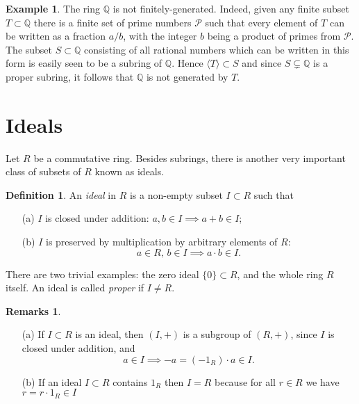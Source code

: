 \documentclass [12pt,oneside,a4paper,mathscr]{amsart}
\theoremstyle{definition}
\newtheorem{defn}[thm]{Definition}
\newtheorem{remarks}[thm]{Remarks}
\newtheorem{example}[thm]{Example}
\renewcommand{\P}{\mathcal{P}}
\newcommand{\Q}{\mathbb{Q}}
\begin{document}
\begin{example}
The ring $\Q$ is not finitely-generated. Indeed, given any finite subset $T\subset \Q$ there is a finite set of prime numbers $\P$ such that every element of $T$ can be written as a fraction $a/b$, with the integer $b$ being a product of primes from $\P$. The subset $S\subset \Q$ consisting of all rational numbers which can be written in this form  is easily seen to be a  subring of $\Q$. Hence $\langle T \rangle \subset S$ and since $S\subsetneq \Q$ is a proper subring, it follows that $\Q$ is not generated by $T$.
\end{example}






\section{Ideals}

Let $R$ be a commutative ring. Besides subrings, there is another very important class of subsets of $R$ known as ideals.

\begin{defn}
An \emph{ideal} in $R$ is a non-empty subset $I\subset R$ such that
\begin{itemize}
\item[(a)] $I$ is closed under addition: $a,b \in I \implies a+b \in I$;
\smallskip
\item[(b)] $I$ is preserved by multiplication by arbitrary elements of $R$:
\[a\in R, \, b\in I \implies a\cdot b \in I.\]
\end{itemize}
\end{defn}

There are two trivial examples: the zero ideal $\{0\}\subset R$, and the whole ring $R$ itself.  An ideal is called \emph{proper} if $I\neq R$.

\begin{remarks}
\label{remy}
\begin{itemize}
\item[(a)]
If $I\subset R$ is an ideal, then $(I,+)$ is a subgroup of $(R,+)$,  since $I$ is closed under addition, and
\[a\in I \implies -a = (-1_R)\cdot a\in I.\]
\item[(b)]
If an ideal   $I\subset R$ contains $1_R$ then $I=R$ because for all $r\in R$ we have $r = r\cdot 1_R \in I$
\end{itemize}
\end{remarks}
\end{document}
